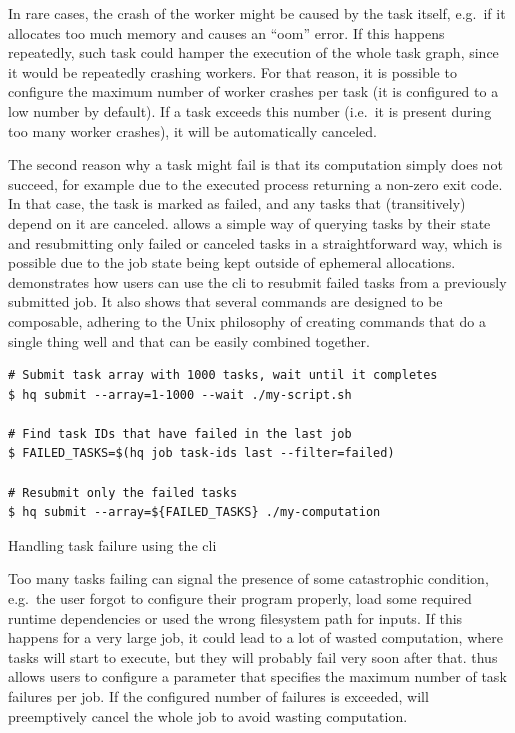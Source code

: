 In rare cases, the crash of the worker might be caused by the task itself, e.g.\ if it allocates
too much memory and causes an ``\gls{oom}'' error. If this happens repeatedly, such
task could hamper the execution of the whole task graph, since it would be repeatedly crashing
workers. For that reason, it is possible to configure the maximum number of worker crashes per task
(it is configured to a low number by default). If a task exceeds this number (i.e.\ it is present
during too many worker crashes), it will be automatically canceled.

The second reason why a task might fail is that its computation simply does not succeed, for
example due to the executed process returning a non-zero exit code. In that case, the task is
marked as failed, and any tasks that (transitively) depend on it are canceled.
\hyperqueue{} allows a simple way of querying tasks by their state and resubmitting only
failed or canceled tasks in a straightforward way, which is possible due to the job state being
kept outside of ephemeral allocations.~ demonstrates how users can use the
\hq{} \gls{cli} to resubmit failed tasks from a previously
submitted job. It also shows that several \hq{} commands are designed to be
composable, adhering to the Unix philosophy of creating commands that do a single thing well and
that can be easily combined together.

\begin{listing}[h]
	\begin{verbatim}
# Submit task array with 1000 tasks, wait until it completes
$ hq submit --array=1-1000 --wait ./my-script.sh

# Find task IDs that have failed in the last job
$ FAILED_TASKS=$(hq job task-ids last --filter=failed)

# Resubmit only the failed tasks
$ hq submit --array=${FAILED_TASKS} ./my-computation
	\end{verbatim}
	\caption{Handling task failure using the \hyperqueue{} \gls{cli}}
	\label{lst:hq-cli-fault-tolerance}
\end{listing}

Too many tasks failing can signal the presence of some catastrophic condition, e.g.\ the user
forgot to configure their program properly, load some required runtime dependencies or used the
wrong filesystem path for inputs. If this happens for a very large job, it could lead to a lot of
wasted computation, where tasks will start to execute, but they will probably fail very soon after
that. \hyperqueue{} thus allows users to configure a parameter that specifies the maximum
number of task failures per job. If the configured number of failures is exceeded,
\hq{} will preemptively cancel the whole job to avoid wasting computation.

